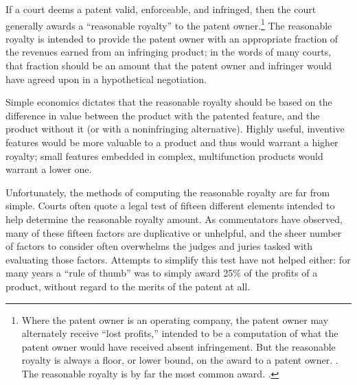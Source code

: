 \documentclass[11pt,twocolumn,titlepage]{article}
\begin{document}
If a court deems a patent valid, enforceable, and infringed, then the court
generally awards a ``reasonable royalty'' to the patent owner.\footnote{Where
the patent owner is an operating company, the patent owner may alternately
receive ``lost profits,'' intended to be a computation of what the patent owner
would have received absent infringement. But the reasonable royalty is always a
floor, or lower bound, on the award to a patent owner. . The reasonable royalty is by far the most common award. .}
The reasonable royalty is intended to provide the patent owner with
an appropriate fraction of the revenues earned from an infringing product; in
the words of many courts, that fraction should be an amount that the patent
owner and infringer would have agreed upon in a hypothetical
negotiation.

Simple economics dictates that the reasonable royalty should be based on the
difference in value between the product with the patented feature, and the
product without it (or with a noninfringing alternative).
Highly useful,
inventive features would be more valuable to a product and thus would warrant a
higher royalty; small features embedded in complex, multifunction products would
warrant a lower one.

Unfortunately, the methods of computing the reasonable royalty are far from
simple. Courts often quote a legal test of fifteen different elements intended
to help determine the reasonable royalty amount.
As commentators have observed,
many of these fifteen factors are duplicative or unhelpful, and the sheer number
of factors to consider often overwhelms the judges and juries tasked with
evaluating those factors.
Attempts to simplify this test have not helped either:
for many years a ``rule of thumb'' was to simply award 25\% of the profits of a
product, without regard to the merits of the patent at all.
\end{document}
